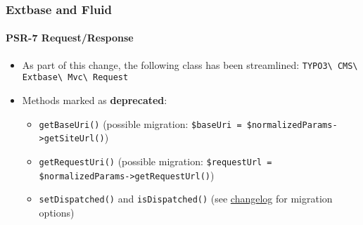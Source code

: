 %

\begin{frame}[fragile]
	\frametitle{Extbase and Fluid}
	\framesubtitle{PSR-7 Request/Response}


	\begin{itemize}
		\item As part of this change, the following class has been streamlined:\newline
			\texttt{TYPO3\textbackslash
				CMS\textbackslash
				Extbase\textbackslash
				Mvc\textbackslash
				Request}
		\item Methods marked as \textbf{deprecated}:
			\begin{itemize}
				\item \texttt{getBaseUri()}\newline
					\smaller(possible migration: \texttt{\$baseUri = \$normalizedParams->getSiteUrl()})\small
				\item \texttt{getRequestUri()}\newline
					\smaller(possible migration: \texttt{\$requestUrl = \$normalizedParams->getRequestUrl()})\small
				\item \texttt{setDispatched()} and \texttt{isDispatched()}\newline
					\smaller(see \href{https://docs.typo3.org/c/typo3/cms-core/master/en-us/Changelog/11.3/Deprecation-94394-ExtbaseRequestSetDispatchedAndIsDispatched.html}{changelog} for migration options)\small
			\end{itemize}

	\end{itemize}

\end{frame}

